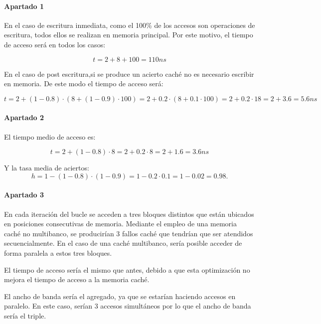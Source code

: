 \paragraph{Apartado 1}

En el caso de escritura inmediata, como el 100\% de los accesos son operaciones
de escritura, todos ellos se realizan en memoria principal. Por este motivo, el
tiempo de acceso será en todos los casos:

\[
t = 2 + 8 + 100 = 110 ns
\]

En el caso de post escritura,si se produce un acierto caché no es necesario escribir en memoria. De este modo el tiempo de acceso será:

\[
t= 2 + (1 - 0.8) \cdot (8 + (1-0.9) \cdot 100) =
2 + 0.2 \cdot (8 + 0.1 \cdot 100) =
2 + 0.2 \cdot 18 = 
2 + 3.6 = 5.6ns
\]

\paragraph{Apartado 2}
El tiempo medio de acceso es: 

\[
t = 2 + (1 - 0.8) \cdot 8 =
2 + 0.2 \cdot 8 =
2 + 1.6 =
3.6ns
\]

Y la tasa media de aciertos: 
\[
h =
1 - (1-0.8) \cdot (1-0.9) =
1-0.2 \cdot 0.1 = 
1 - 0.02 =
0.98.
\]

\paragraph{Apartado 3}

En cada iteración del bucle se acceden a tres bloques distintos que están
ubicados en posiciones consecutivas de memoria. Mediante el empleo de una
memoria caché no multibanco, se producirían 3 fallos caché que tendrían que ser
atendidos secuencialmente. En el caso de una caché multibanco, sería posible
acceder de forma paralela a estos tres bloques.

El tiempo de acceso sería el mismo que antes, debido a que esta optimización no
mejora el tiempo de acceso a la memoria caché.

El ancho de banda sería el agregado, ya que se estarían haciendo accesos en
paralelo. En este caso, serían 3 accesos simultáneos por lo que el ancho de
banda sería el triple.

